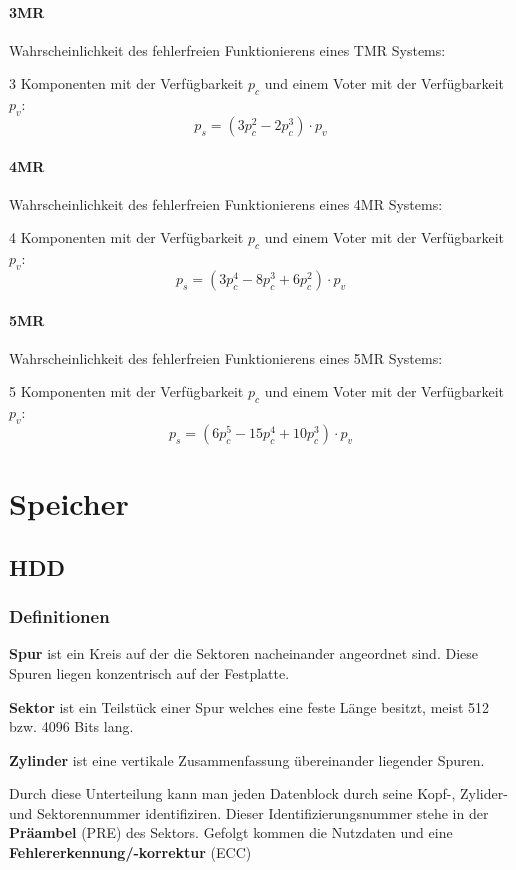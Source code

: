 \documentclass[a4paper, landscape]{article}
\newcommand*\spaceline{\par\vspace{\belowdisplayskip}}
\begin{document}
\begin{multicols}{3}
        \paragraph{3MR} Wahrscheinlichkeit des fehlerfreien Funktionierens eines TMR Systems:\par 
        3 Komponenten mit der Verfügbarkeit $p_{c}$ und einem Voter mit der Verfügbarkeit $p_{v}$:
        \[
         p_{s} = \left(3 p_{c}^{2} - 2 p_{c}^{3} \right) \cdot p_{v}
        \]
        
        \paragraph{4MR} Wahrscheinlichkeit des fehlerfreien Funktionierens eines 4MR Systems:\par 
        4 Komponenten mit der Verfügbarkeit $p_{c}$ und einem Voter mit der Verfügbarkeit $p_{v}$:
        \[
         p_{s} = \left(3 p_{c}^{4} - 8 p_{c}^{3} + 6 p_{c}^{2} \right) \cdot p_{v}
        \]
        
        \paragraph{5MR} Wahrscheinlichkeit des fehlerfreien Funktionierens eines 5MR Systems:\par 
        5 Komponenten mit der Verfügbarkeit $p_{c}$ und einem Voter mit der Verfügbarkeit $p_{v}$:
        \[
         p_{s} = \left(6 p_{c}^{5} - 15 p_{c}^{4} + 10 p_{c}^{3} \right) \cdot p_{v}
        \]
        
        \section{Speicher}
        
        \subsection{HDD}
        
        \subsubsection{Definitionen}
        \textbf{Spur} ist ein Kreis auf der die Sektoren nacheinander angeordnet sind. Diese Spuren liegen konzentrisch auf der Festplatte.
        \spaceline
        \textbf{Sektor} ist ein Teilstück einer Spur welches eine feste Länge besitzt, meist 512 bzw. 4096 Bits lang.
        \spaceline
        \textbf{Zylinder} ist eine vertikale Zusammenfassung übereinander liegender Spuren.
        \spaceline
        Durch diese Unterteilung kann man jeden Datenblock durch seine Kopf-, Zylider- und Sektorennummer identifiziren. 
        Dieser Identifizierungsnummer stehe in der \textbf{Präambel} (PRE) des Sektors. 
        Gefolgt kommen die Nutzdaten und eine \textbf{Fehlererkennung/-korrektur} (ECC)
        

\end{multicols}
\end{document}
